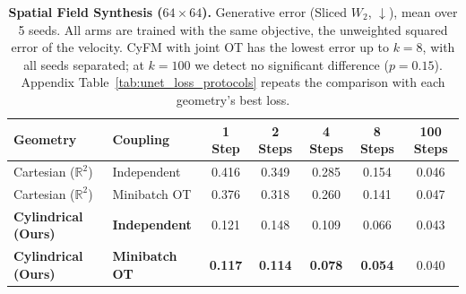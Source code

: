 \begin{table}[h]
    \centering
    \caption{\textbf{Spatial Field Synthesis ($64\times64$).} Generative error (Sliced $W_2$, $\downarrow$), mean over 5 seeds. All arms are trained with the same objective, the unweighted squared error of the velocity. CyFM with joint OT has the lowest error up to $k = 8$, with all seeds separated; at $k = 100$ we detect no significant difference ($p = 0.15$). Appendix Table~\ref{tab:unet_loss_protocols} repeats the comparison with each geometry's best loss.}
    \label{tab:unet_baseline}
    \vspace{1mm}
    \begin{tabular}{llccccc}
        \toprule
        \textbf{Geometry} & \textbf{Coupling} & \textbf{1 Step} & \textbf{2 Steps} & \textbf{4 Steps} & \textbf{8 Steps} & \textbf{100 Steps} \\
        \midrule
        Cartesian ($\mathbb{R}^2$) & Independent & 0.416 & 0.349 & 0.285 & 0.154 & 0.046 \\
        Cartesian ($\mathbb{R}^2$) & Minibatch OT & 0.376 & 0.318 & 0.260 & 0.141 & 0.047 \\
        \midrule
        \textbf{Cylindrical (Ours)} & \textbf{Independent} & 0.121 & 0.148 & 0.109 & 0.066 & 0.043 \\
        \textbf{Cylindrical (Ours)} & \textbf{Minibatch OT} & \textbf{0.117} & \textbf{0.114} & \textbf{0.078} & \textbf{0.054} & 0.040 \\
        \bottomrule
    \end{tabular}
    \vspace{1mm}
\end{table}
